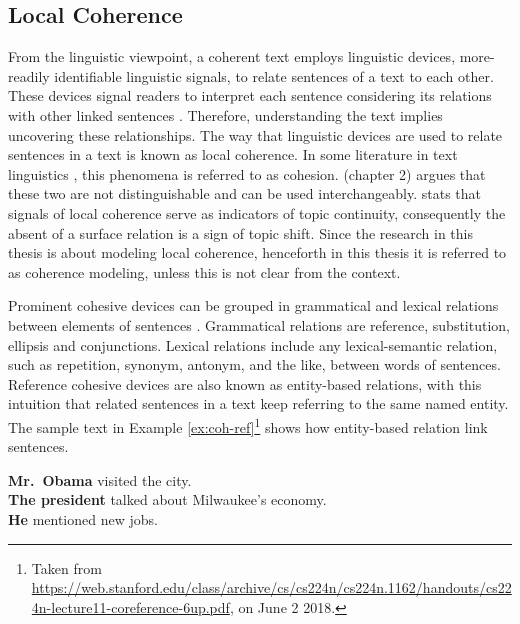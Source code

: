 \subsection{Local Coherence}

From the linguistic viewpoint, a coherent text employs linguistic devices, more-readily identifiable linguistic signals, to relate sentences of a text to each other. 
These devices signal readers to interpret each sentence considering its relations with other linked sentences \cite{vandijk77}. 
Therefore, understanding the text implies uncovering these relationships.  
The way that linguistic devices are used to relate sentences in a text is known as local coherence. 
In some literature in text linguistics \cite{halliday76}, this phenomena is referred to as cohesion.   
 (chapter 2) argues that these two are not distinguishable and can be used interchangeably. 
 stats that signals of local coherence serve as indicators of topic continuity, consequently the absent of a surface relation is a sign of topic shift. 
Since the research in this thesis is about modeling local coherence, henceforth in this thesis it is referred to as coherence modeling, unless this is not clear from the context. 

Prominent cohesive devices can be grouped in grammatical and lexical relations between elements of sentences \cite{halliday76}. 
Grammatical relations are reference, substitution, ellipsis and conjunctions. 
Lexical relations include any lexical-semantic relation, such as repetition, synonym, antonym, and the like, between words of sentences. 
Reference cohesive devices are also known as entity-based relations, with this intuition that related sentences in a text keep referring to the same named entity. 
The sample text in Example \ref{ex:coh-ref}\footnote{Taken from \url{https://web.stanford.edu/class/archive/cs/cs224n/cs224n.1162/handouts/cs224n-lecture11-coreference-6up.pdf}, on June 2 2018.} shows how entity-based relation link sentences. 

\begin{examples}
	\label{ex:coh-ref}
	\textbf{Mr.\ Obama} visited the city. \\
	\textbf{The president} talked about Milwaukee’s economy. \\
	\textbf{He} mentioned new jobs. \\
\end{examples} 


